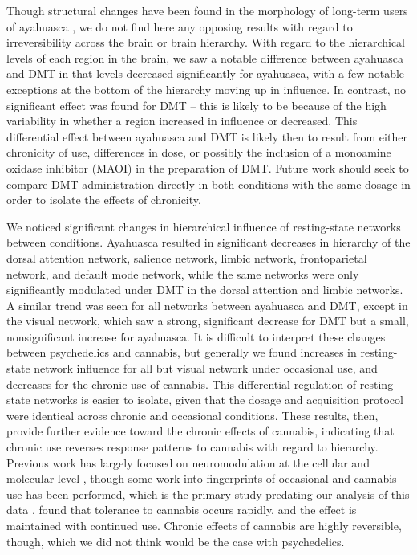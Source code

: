 Though structural changes have
been found in the morphology of long-term users of ayahuasca \parencite{Bouso2015}, 
we do not find here any opposing results with regard to irreversibility across the brain
or brain hierarchy. With regard to the hierarchical levels of each region in the brain,
we saw a notable difference between ayahuasca and DMT in that levels decreased significantly
for ayahuasca, with a few notable exceptions at the bottom of the hierarchy moving up in influence.
In contrast, no significant effect was found for DMT -- this is likely to be because of the
high variability in whether a region increased in influence or decreased. This differential
effect between ayahuasca and DMT is likely then to result from either chronicity of use,
differences in dose, or possibly the inclusion of a monoamine oxidase inhibitor (MAOI) in
the preparation of DMT. Future work should seek to compare DMT administration directly
in both conditions with the same dosage in order to isolate the effects of chronicity.

We noticed significant changes in hierarchical influence of resting-state networks
between conditions. Ayahuasca resulted in significant decreases in hierarchy of the
dorsal attention network, salience network, limbic network, frontoparietal network, and default mode network, while the same networks were only significantly modulated under DMT in the dorsal attention and limbic networks. A similar trend was seen for all networks between ayahuasca and DMT,
except in the visual network, which saw a strong, significant decrease for DMT but a small, nonsignificant increase for ayahuasca. It is difficult to interpret these changes between psychedelics and cannabis, but generally we found increases in resting-state network influence for all but visual network under occasional use, and decreases for the chronic use of cannabis. This differential regulation of resting-state networks is easier to isolate, given that
the dosage and acquisition protocol were identical across chronic and occasional conditions. These results, then, provide further evidence toward the chronic effects of cannabis, indicating
that chronic use reverses response patterns to cannabis with regard to hierarchy. Previous work has largely focused on neuromodulation at the cellular
and molecular level \parencite{Hirvonen2012, Bosker2013}, though some work into fingerprints
of occasional and cannabis use has been performed, which is the primary study predating our analysis of this data \parencite{Ramaekers2022}. \textcite{Ramaekers2020} found that tolerance to cannabis occurs rapidly, and the
effect is maintained with continued use. Chronic
effects of cannabis are highly reversible, though, which we did not think would be the
case with psychedelics.

